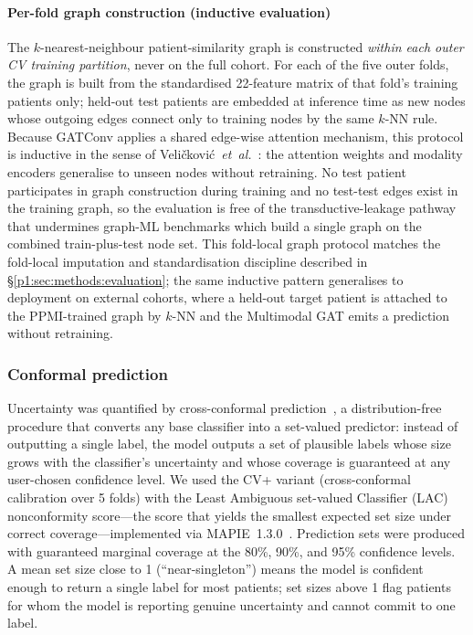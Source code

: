 \paragraph*{Per-fold graph construction (inductive evaluation)} The $k$-nearest-neighbour patient-similarity graph is constructed \emph{within each outer CV training partition}, never on the full cohort. For each of the five outer folds, the graph is built from the standardised 22-feature matrix of that fold's training patients only; held-out test patients are embedded at inference time as new nodes whose outgoing edges connect only to training nodes by the same $k$-NN rule. Because GATConv applies a shared edge-wise attention mechanism, this protocol is inductive in the sense of Veli\v{c}kovi\'{c}~\textit{et~al.}~\cite{velickovic2018gat}: the attention weights and modality encoders generalise to unseen nodes without retraining. No test patient participates in graph construction during training and no test-test edges exist in the training graph, so the evaluation is free of the transductive-leakage pathway that undermines graph-ML benchmarks which build a single graph on the combined train-plus-test node set. This fold-local graph protocol matches the fold-local imputation and standardisation discipline described in \S\ref{p1:sec:methods:evaluation}; the same inductive pattern generalises to deployment on external cohorts, where a held-out target patient is attached to the PPMI-trained graph by $k$-NN and the Multimodal GAT emits a prediction without retraining.

\subsubsection{Conformal prediction}
Uncertainty was quantified by cross-conformal prediction~\cite{vovk2022,shafer2008,angelopoulos2021}, a distribution-free procedure that converts any base classifier into a set-valued predictor: instead of outputting a single label, the model outputs a set of plausible labels whose size grows with the classifier's uncertainty and whose coverage is guaranteed at any user-chosen confidence level. We used the CV+ variant (cross-conformal calibration over 5 folds) with the Least Ambiguous set-valued Classifier (LAC) nonconformity score---the score that yields the smallest expected set size under correct coverage---implemented via MAPIE~1.3.0~\cite{mapie2022}. Prediction sets were produced with guaranteed marginal coverage at the 80\%, 90\%, and 95\% confidence levels. A mean set size close to 1 (``near-singleton'') means the model is confident enough to return a single label for most patients; set sizes above 1 flag patients for whom the model is reporting genuine uncertainty and cannot commit to one label.

